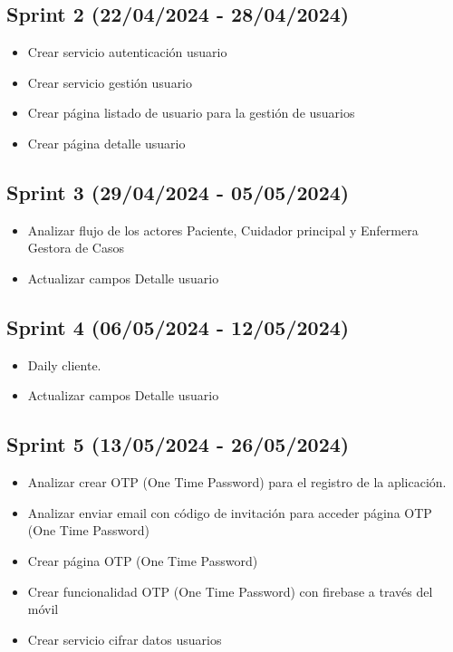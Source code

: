 \subsection{Sprint 2 (22/04/2024 - 28/04/2024)}
\begin{itemize}
\tightlist 
\item Crear servicio autenticación usuario
\item Crear servicio gestión usuario
\item Crear página listado de usuario para la gestión de usuarios
\item Crear página detalle usuario
\end{itemize}

\subsection{Sprint 3 (29/04/2024 - 05/05/2024)}
\begin{itemize}
\tightlist 
\item Analizar flujo de los actores Paciente, Cuidador principal y Enfermera Gestora de Casos
\item Actualizar campos Detalle usuario
\end{itemize}

\subsection{Sprint 4 (06/05/2024 - 12/05/2024)}
\begin{itemize}
\tightlist 
\item Daily cliente.
\item Actualizar campos Detalle usuario
\end{itemize}

\subsection{Sprint 5 (13/05/2024 - 26/05/2024)}
\begin{itemize}
\tightlist 
\item Analizar crear OTP (One Time Password) para el registro de la aplicación.
\item Analizar enviar email con código de invitación para acceder página OTP (One Time Password)
\item Crear página OTP (One Time Password)
\item Crear funcionalidad OTP (One Time Password) con firebase a través del móvil
\item Crear servicio cifrar datos usuarios
\end{itemize}

